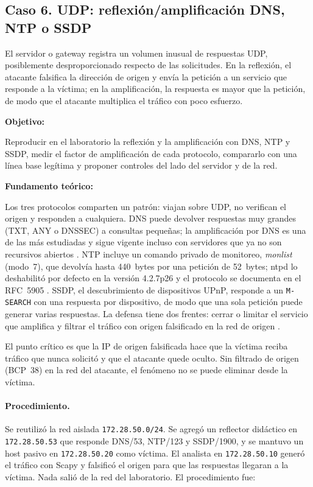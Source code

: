 \clearpage
\subsection{Caso 6. UDP: reflexión/amplificación DNS, NTP o SSDP}
\label{caso:udp-reflexion}

\begin{situacion}
El servidor o gateway registra un volumen inusual de respuestas UDP, posiblemente desproporcionado respecto de las solicitudes. En la reflexión, el atacante falsifica la dirección de origen y envía la petición a un servicio que responde a la víctima; en la amplificación, la respuesta es mayor que la petición, de modo que el atacante multiplica el tráfico con poco esfuerzo.

\textbf{Objetivo:} \par
Reproducir en el laboratorio la reflexión y la amplificación con DNS, NTP y SSDP, medir el factor de amplificación de cada protocolo, compararlo con una línea base legítima y proponer controles del lado del servidor y de la red.

\textbf{Fundamento teórico:} \par
Los tres protocolos comparten un patrón: viajan sobre UDP, no verifican el origen y responden a cualquiera. DNS puede devolver respuestas muy grandes (TXT, ANY o DNSSEC) a consultas pequeñas; la amplificación por DNS es una de las más estudiadas y sigue vigente incluso con servidores que ya no son recursivos abiertos \parencite{nawrocki2021farside,koch2025forward}. NTP incluye un comando privado de monitoreo, \textit{monlist} (modo~7), que devolvía hasta 440~bytes por una petición de 52~bytes; ntpd lo deshabilitó por defecto en la versión 4.2.7p26 y el protocolo se documenta en el RFC~5905 \parencite{rfc5905}. SSDP, el descubrimiento de dispositivos UPnP, responde a un \texttt{M-SEARCH} con una respuesta por dispositivo, de modo que una sola petición puede generar varias respuestas. La defensa tiene dos frentes: cerrar o limitar el servicio que amplifica y filtrar el tráfico con origen falsificado en la red de origen \parencite{nawrocki2023sok,kopp2021ddos}.

El punto crítico es que la IP de origen falsificada hace que la víctima reciba tráfico que nunca solicitó y que el atacante quede oculto. Sin filtrado de origen (BCP~38) en la red del atacante, el fenómeno no se puede eliminar desde la víctima.
\end{situacion}

\paragraph{Procedimiento.}
Se reutilizó la red aislada \texttt{172.28.50.0/24}. Se agregó un reflector didáctico en \texttt{172.28.50.53} que responde DNS/53, NTP/123 y SSDP/1900, y se mantuvo un host pasivo en \texttt{172.28.50.20} como víctima. El analista en \texttt{172.28.50.10} generó el tráfico con Scapy y falsificó el origen para que las respuestas llegaran a la víctima. Nada salió de la red del laboratorio. El procedimiento fue:

